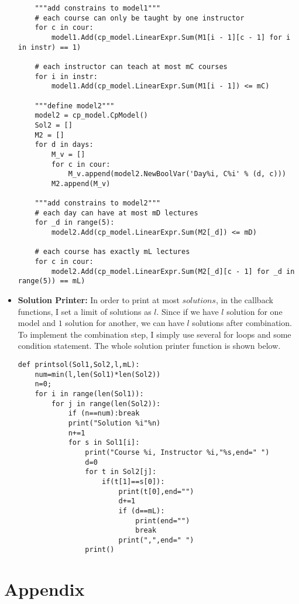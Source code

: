 \documentclass{article}
\begin{document}
\begin{itemize}
\begin{verbatim}
    """add constrains to model1"""
    # each course can only be taught by one instructor
    for c in cour:
        model1.Add(cp_model.LinearExpr.Sum(M1[i - 1][c - 1] for i in instr) == 1)

    # each instructor can teach at most mC courses
    for i in instr:
        model1.Add(cp_model.LinearExpr.Sum(M1[i - 1]) <= mC)

    """define model2"""
    model2 = cp_model.CpModel()
    Sol2 = []
    M2 = []
    for d in days:
        M_v = []
        for c in cour:
            M_v.append(model2.NewBoolVar('Day%i, C%i' % (d, c)))
        M2.append(M_v)

    """add constrains to model2"""
    # each day can have at most mD lectures
    for _d in range(5):
        model2.Add(cp_model.LinearExpr.Sum(M2[_d]) <= mD)

    # each course has exactly mL lectures
    for c in cour:
        model2.Add(cp_model.LinearExpr.Sum(M2[_d][c - 1] for _d in range(5)) == mL)
\end{verbatim}
\item \textbf{Solution Printer: }In order to print at most $solutions$, in the callback functions, I set a limit of solutions as $l$. Since if we have $l$ solution for one model and $1$ solution for another, we can have $l$ solutions after combination. To implement the combination step, I simply use several for loops and some condition statement. The whole solution printer function is shown below. 
\begin{verbatim}
def printsol(Sol1,Sol2,l,mL):
    num=min(l,len(Sol1)*len(Sol2))
    n=0;
    for i in range(len(Sol1)):
        for j in range(len(Sol2)):
            if (n==num):break
            print("Solution %i"%n)
            n+=1
            for s in Sol1[i]:
                print("Course %i, Instructor %i,"%s,end=" ")
                d=0
                for t in Sol2[j]:
                    if(t[1]==s[0]):
                        print(t[0],end="")
                        d+=1
                        if (d==mL):
                            print(end="")
                            break
                        print(",",end=" ")
                print()
\end{verbatim}
\end{itemize}
\newpage
\section*{Appendix}
\end{document}
